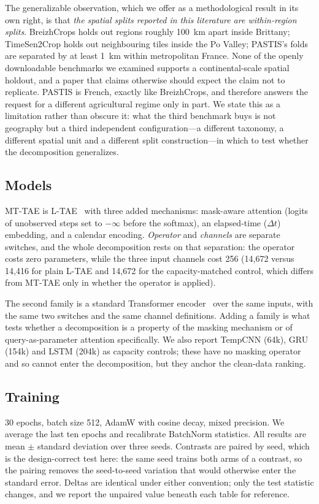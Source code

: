 \documentclass[journal]{IEEEtran}
\begin{document}
The generalizable observation, which we offer as a methodological result in its
own right, is that \emph{the spatial splits reported in this literature are
within-region splits}. BreizhCrops holds out regions roughly 100~km apart inside
Brittany; TimeSen2Crop holds out neighbouring tiles inside the Po Valley;
PASTIS's folds are separated by at least 1~km within metropolitan France. None
of the openly downloadable benchmarks we examined supports a
continental-scale spatial holdout, and a paper that claims otherwise should
expect the claim not to replicate. PASTIS is French, exactly like BreizhCrops,
and therefore answers the request for a different agricultural regime only in
part. We state this as a limitation rather than obscure it: what the third
benchmark buys is not geography but a third independent configuration---a
different taxonomy, a different spatial unit and a different split
construction---in which to test whether the decomposition generalizes.

\subsection{Models}
MT-TAE is L-TAE~\cite{ltae} with three added mechanisms: mask-aware attention
(logits of unobserved steps set to $-\infty$ before the softmax), an
elapsed-time ($\Delta t$) embedding, and a calendar encoding.
\emph{Operator} and \emph{channels} are separate switches, and the whole
decomposition rests on that separation: the operator costs zero parameters,
while the three input channels cost 256 (14{,}672 versus 14{,}416 for plain
L-TAE and 14{,}672 for the capacity-matched control, which differs from MT-TAE
only in whether the operator is applied).

The second family is a standard Transformer encoder~\cite{vaswani} over the same
inputs, with the same two switches and the same channel definitions. Adding a
family is what tests whether a decomposition is a property of the masking
mechanism or of query-as-parameter attention specifically. We also report
TempCNN (64k), GRU (154k) and LSTM (204k) as capacity controls; these have no
masking operator and so cannot enter the decomposition, but they anchor the
clean-data ranking.

\subsection{Training}
30 epochs, batch size 512, AdamW with cosine decay, mixed precision. We average
the last ten epochs and recalibrate BatchNorm statistics. All results are mean
$\pm$ standard deviation over three seeds. Contrasts are paired by seed, which
is the design-correct test here: the same seed trains both arms of a contrast,
so the pairing removes the seed-to-seed variation that would otherwise enter the
standard error. Deltas are identical under either convention; only the test
statistic changes, and we report the unpaired value beneath each table for
reference.
\end{document}
